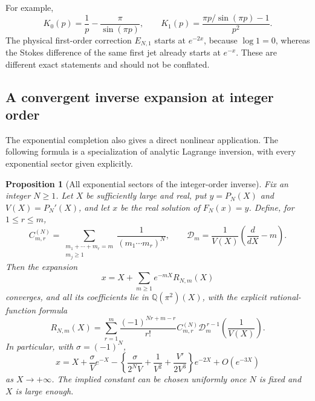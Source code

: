 \documentclass[11pt,a4paper]{article}
\numberwithin{equation}{section}
\newtheorem{proposition}[theorem]{Proposition}
\theoremstyle{definition}
\theoremstyle{remark}
\begin{document}
For example,
\[
 K_0(p)=\frac1p-\frac\pi{\sin(\pi p)},\qquad
 K_1(p)=\frac{\pi p/\sin(\pi p)-1}{p^2}.
\]
The physical first-order correction $E_{N,1}$ starts at $e^{-2x}$,
because $\log1=0$, whereas the Stokes difference of the same first jet
already starts at $e^{-x}$. These are different exact statements and
should not be conflated.

\subsection{A convergent inverse expansion at integer order}

The exponential completion also gives a direct nonlinear application.
The following formula is a specialization of analytic Lagrange
inversion, with every exponential sector given explicitly.

\begin{proposition}[All exponential sectors of the integer-order inverse]
\label{prop:borel-inverse}
Fix an integer $N\geq1$. Let $X$ be sufficiently large and real, put
$y=P_N(X)$ and $V(X)=P_N'(X)$, and let $x$ be the real solution of
$F_N(x)=y$. Define, for $1\leq r\leq m$,
\[
 C_{m,r}^{(N)}=
 \sum_{\substack{m_1+\cdots+m_r=m\\m_j\geq1}}
 \frac1{(m_1\cdots m_r)^N},\qquad
 \mathcal D_m=\frac1{V(X)}\left(\frac{d}{dX}-m\right).
\]
Then the expansion
\begin{equation}\label{eq:borel-inverse-series}
 x=X+\sum_{m\geq1}e^{-mX}R_{N,m}(X)
\end{equation}
converges, and all its coefficients lie in $\mathbb Q(\pi^2)(X)$, with
the explicit rational-function formula
\begin{equation}\label{eq:borel-inverse-coeff}
 R_{N,m}(X)=\sum_{r=1}^m
 \frac{(-1)^{Nr+m-r}}{r!}C_{m,r}^{(N)}
 \mathcal D_m^{\,r-1}\left(\frac1{V(X)}\right).
\end{equation}
In particular, with $\sigma=(-1)^N$,
\begin{equation}\label{eq:borel-inverse-two}
 x=X+\frac{\sigma}{V}e^{-X}
 -\left\{\frac{\sigma}{2^NV}+\frac1{V^2}
                  +\frac{V'}{2V^3}\right\}e^{-2X}
 +O(e^{-3X})
\end{equation}
as $X\to+\infty$. The implied constant can be chosen uniformly once
$N$ is fixed and $X$ is large enough.
\end{proposition}
\end{document}
